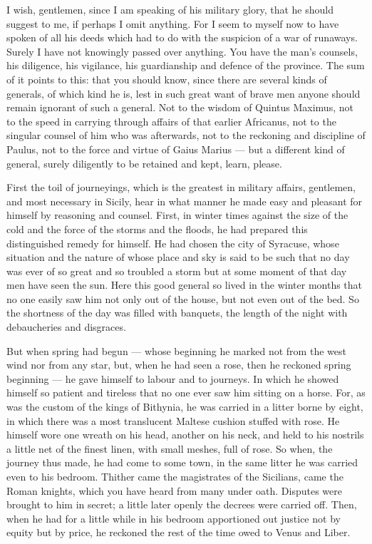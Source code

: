  I wish, gentlemen, since I am speaking of his military glory, that he should suggest to me, if perhaps I omit anything. For I seem to myself now to have spoken of all his deeds which had to do with the suspicion of a war of runaways. Surely I have not knowingly passed over anything. You have the man's counsels, his diligence, his vigilance, his guardianship and defence of the province. The sum of it points to this: that you should know, since there are several kinds of generals, of which kind he is, lest in such great want of brave men anyone should remain ignorant of such a general. Not to the wisdom of Quintus Maximus, not to the speed in carrying through affairs of that earlier Africanus, not to the singular counsel of him who was afterwards, not to the reckoning and discipline of Paulus, not to the force and virtue of Gaius Marius --- but a different kind of general, surely diligently to be retained and kept, learn, please.

 First the toil of journeyings, which is the greatest in military affairs, gentlemen, and most necessary in Sicily, hear in what manner he made easy and pleasant for himself by reasoning and counsel. First, in winter times against the size of the cold and the force of the storms and the floods, he had prepared this distinguished remedy for himself. He had chosen the city of Syracuse, whose situation and the nature of whose place and sky is said to be such that no day was ever of so great and so troubled a storm but at some moment of that day men have seen the sun. Here this good general so lived in the winter months that no one easily saw him not only out of the house, but not even out of the bed. So the shortness of the day was filled with banquets, the length of the night with debaucheries and disgraces.

 But when spring had begun --- whose beginning he marked not from the west wind nor from any star, but, when he had seen a rose, then he reckoned spring beginning --- he gave himself to labour and to journeys. In which he showed himself so patient and tireless that no one ever saw him sitting on a horse. For, as was the custom of the kings of Bithynia, he was carried in a litter borne by eight, in which there was a most translucent Maltese cushion stuffed with rose. He himself wore one wreath on his head, another on his neck, and held to his nostrils a little net of the finest linen, with small meshes, full of rose. So when, the journey thus made, he had come to some town, in the same litter he was carried even to his bedroom. Thither came the magistrates of the Sicilians, came the Roman knights, which you have heard from many under oath. Disputes were brought to him in secret; a little later openly the decrees were carried off. Then, when he had for a little while in his bedroom apportioned out justice not by equity but by price, he reckoned the rest of the time owed to Venus and Liber.

